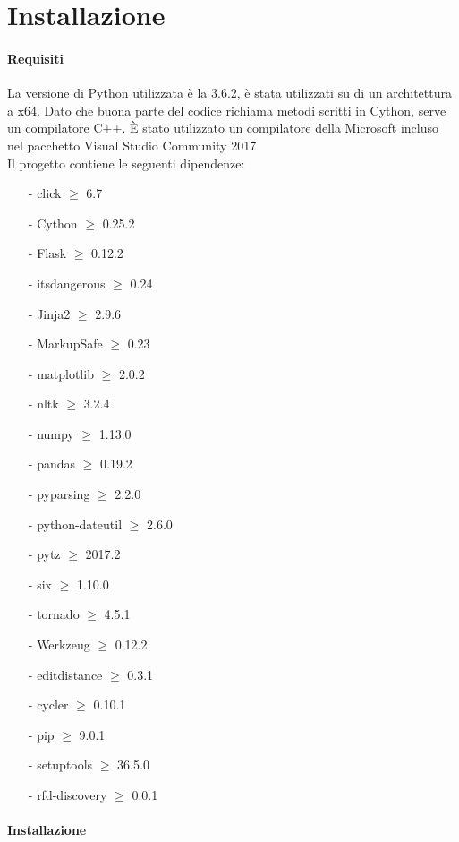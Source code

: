 \section{Installazione}
\paragraph{Requisiti}
La versione di Python utilizzata è la 3.6.2, è stata utilizzati su di un architettura a x64.
Dato che buona parte del codice richiama metodi scritti in Cython, serve un compilatore C++. È stato utilizzato un compilatore della Microsoft incluso nel pacchetto Visual Studio Community 2017 \\
Il progetto contiene le seguenti dipendenze:
\begin{itemize}[noitemsep]
\item[-] click $\geq$ 6.7
\item[-] Cython $\geq$ 0.25.2
\item[-] Flask $\geq$ 0.12.2
\item[-] itsdangerous $\geq$ 0.24
\item[-] Jinja2 $\geq$ 2.9.6
\item[-] MarkupSafe $\geq$ 0.23
\item[-] matplotlib $\geq$ 2.0.2
\item[-] nltk $\geq$ 3.2.4
\item[-] numpy $\geq$ 1.13.0
\item[-] pandas $\geq$ 0.19.2
\item[-] pyparsing $\geq$ 2.2.0
\item[-] python-dateutil $\geq$ 2.6.0
\item[-] pytz $\geq$ 2017.2
\item[-] six $\geq$ 1.10.0
\item[-] tornado $\geq$ 4.5.1
\item[-] Werkzeug $\geq$ 0.12.2
\item[-] editdistance $\geq$ 0.3.1
\item[-] cycler $\geq$ 0.10.1
\item[-] pip $\geq$ 9.0.1
\item[-] setuptools $\geq$ 36.5.0
\item[-] rfd-discovery $\geq$ 0.0.1
\end{itemize}
\paragraph{Installazione}

